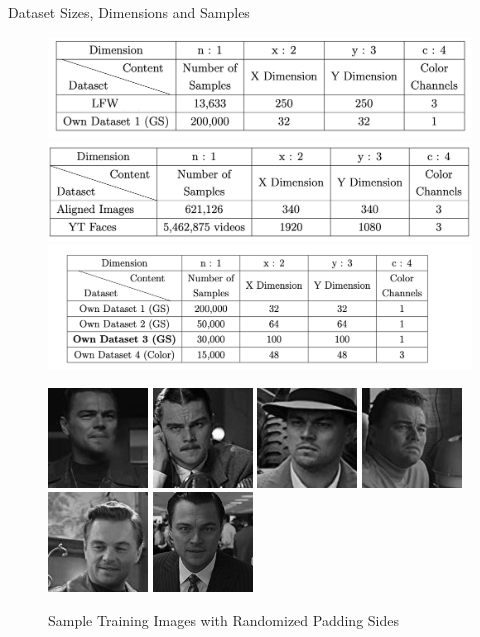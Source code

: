 \documentclass{beamer}
\begin{document}
\begin{frame}{Dataset Sizes, Dimensions and Samples}
    \begin{figure}
        \centering
        \includegraphics[width = 6 cm]{images/table 1.png}
        \includegraphics[width = 6 cm]{images/table 2.png}
        \includegraphics[width = 8 cm]{images/own dataset.png}
        \label{fig:my_label}
    \end{figure}
    \begin{figure}
        \includegraphics[width = 1.6 cm]{images/leo/3c5d0190660}\hfill
        \includegraphics[width = 1.6 cm]{images/leo/3e3f6a53350}\hfill
        \includegraphics[width = 1.6 cm]{images/leo/3f4b0e0c760}\hfill
        \includegraphics[width = 1.6 cm]{images/leo/4b605e33360}\hfill
        \includegraphics[width = 1.6 cm]{images/leo/24eb14f9da0}\hfill
        \includegraphics[width = 1.6 cm]{images/leo/188d3b34ff1}\hfill
        \caption{Sample Training Images with Randomized Padding Sides}
    \end{figure}
\end{frame}
\end{document}
